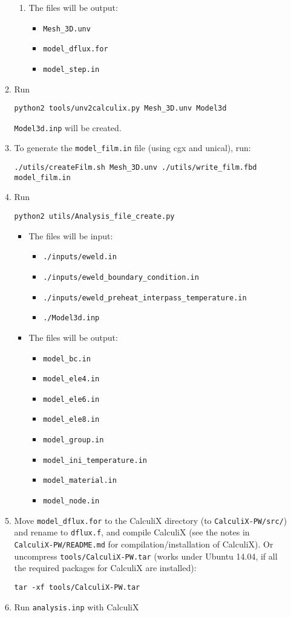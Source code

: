 \documentclass[12pt,letterpaper]{article}
\newcommand{\verbStyle}[1]{{\color{SteelBlue40}\colorbox{LightSteelBlue10}{{#1}}}}
\let\OldTexttt\texttt
\renewcommand{\texttt}[1]{\OldTexttt{\verbStyle{#1}}}
\begin{document}
\begin{itemize}
\begin{enumerate}
\begin{enumerate}
\item The files will be output: 
\begin{itemize}
\item \texttt{Mesh\_3D.unv}
\item \texttt{model\_dflux.for}
\item \texttt{model\_step.in}
\end{itemize}
\end{enumerate}
\item Run 
\begin{verbatim}
python2 tools/unv2calculix.py Mesh_3D.unv Model3d
\end{verbatim}
\texttt{Model3d.inp} will be created.
\item To generate the \texttt{model\_film.in} file (using cgx and unical), run:
\begin{verbatim}
./utils/createFilm.sh Mesh_3D.unv ./utils/write_film.fbd model_film.in
\end{verbatim}
\item Run 
\begin{verbatim}
python2 utils/Analysis_file_create.py
\end{verbatim}
\begin{itemize}
\item The files will be input:
\begin{itemize}
\item \texttt{./inputs/eweld.in}
\item \texttt{./inputs/eweld\_boundary\_condition.in}
\item \texttt{./inputs/eweld\_preheat\_interpass\_temperature.in}
\item \texttt{./Model3d.inp}
\end{itemize}
\item The files will be output:
\begin{itemize}
\item \texttt{model\_bc.in}
\item \texttt{model\_ele4.in}
\item \texttt{model\_ele6.in}
\item \texttt{model\_ele8.in}
\item \texttt{model\_group.in}
\item \texttt{model\_ini\_temperature.in}
\item \texttt{model\_material.in}
\item \texttt{model\_node.in}
\end{itemize}
\end{itemize}
\item Move \texttt{model\_dflux.for} to the CalculiX directory (to \texttt{CalculiX-PW/src/}) and rename to \texttt{dflux.f}, and compile CalculiX
(see the notes in \texttt{CalculiX-PW/README.md} for compilation/installation of CalculiX).
Or uncompress \texttt{tools/CalculiX-PW.tar} (works under Ubuntu 14.04, if all the required packages for CalculiX are installed):
\begin{verbatim}
tar -xf tools/CalculiX-PW.tar
\end{verbatim}
\item Run \texttt{analysis.inp} with CalculiX
\end{enumerate}
\end{itemize}
\end{document}
